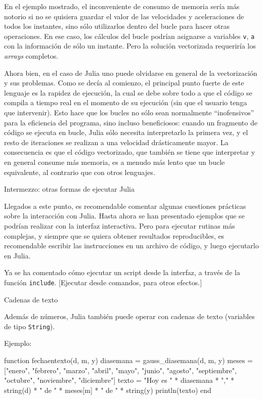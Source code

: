 ﻿\documentclass[spanish]{article}
\begin{document}
En el ejemplo mostrado, el inconveniente de consumo de memoria sería
más notorio si no se quisiera guardar el valor de las velocidades y
aceleraciones de todos los instantes, sino sólo utilizarlos dentro
del bucle para hacer otras operaciones. En ese caso, los cálculos del bucle
podrían asignarse a variables \texttt{v}, \texttt{a} con la información de sólo
un instante. Pero la solución vectorizada requeriría los \emph{arrays}
completos.

Ahora bien, en el caso de Julia uno puede olvidarse en general
de la vectorización y sus problemas. Como se decía al comienzo, el principal punto
fuerte de este lenguaje es la rapidez de ejecución, la cual se debe
sobre todo a que el código se compila a tiempo real en el momento de
su ejecución (sin que el usuario tenga que intervenir). Esto hace
que los bucles no sólo sean normalmente ``inofensivos'' para la
eficiencia del programa, sino incluso beneficiosos: cuando un
fragmento de código se ejecuta en bucle, Julia sólo necesita
interpretarlo la primera vez, y el resto de iteraciones se realizan
a una velocidad drásticamente mayor. La consecuencia es que
el código vectorizado, que también se tiene que interpretar y
en general consume más memoria, es a menudo más lento que un bucle
equivalente, al contrario que con otros lenguajes.


Intermezzo: otras formas de ejecutar Julia

Llegados a este punto, es recomendable comentar algunas cuestiones prácticas
sobre la interacción con Julia. Hasta ahora se han presentado ejemplos
que se podrían realizar con la interfaz interactiva. Pero para ejecutar
rutinas más complejas, y siempre que
se quiera obtener resultados reproducibles, es recomendable escribir
las instrucciones en un archivo de código, y luego ejecutarlo en Julia.

Ya se ha comentado cómo ejecutar un script desde la interfaz, a través de
la función \texttt{include}. [Ejecutar desde comandos, para otros efectos.]


Cadenas de texto


Además de números, Julia también puede operar con cadenas de texto
(variables de tipo \texttt{String}). 

Ejemplo:

function fechaentexto(d, m, y)
  diasemana = gauss_diasemana(d, m, y)
  meses = ["enero", "febrero", "marzo", "abril", "mayo", "junio",
    "agosto", "septiembre", "octubre", "noviembre", "diciembre"]
  texto = "Hoy es " * diasemana * "," * 
    string(d) * " de " * meses[m] * " de " * string(y)
  println(texto)
end
\end{document}
